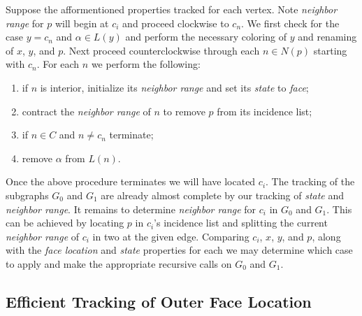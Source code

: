 \documentclass[11pt,letter]{article}
\begin{document}
\noindent Suppose the afformentioned properties tracked for each vertex. Note \emph{neighbor range}
for $p$ will begin at $c_i$ and proceed clockwise to $c_n$. We first check for the case $y=c_n$ and
$\alpha\in L(y)$ and perform the necessary coloring of $y$ and renaming of $x$, $y$, and $p$. Next proceed
counterclockwise through each $n\in N(p)$ starting with $c_n$. For each $n$ we perform the following:

\begin{enumerate}
\item if $n$ is interior, initialize its \emph{neighbor range} and set its \emph{state} to \emph{face};
\item contract the \emph{neighbor range} of $n$ to remove $p$ from its incidence list;
\item if $n\in C$ and $n\ne c_n$ terminate;
\item remove $\alpha$ from $L(n)$.
\end{enumerate}

\noindent Once the above procedure terminates we will have located $c_i$. The tracking of the subgraphs $G_0$ and $G_1$
are already almost complete by our tracking of \emph{state} and \emph{neighbor range}. It remains to determine
\emph{neighbor range} for $c_i$ in $G_0$ and $G_1$. This can be achieved by locating $p$ in $c_i$'s incidence list
and splitting the current \emph{neighbor range} of $c_i$ in two at the given edge. Comparing $c_i$, $x$, $y$, and
$p$, along with the \emph{face location} and \emph{state} properties for each we may determine which case to
apply and make the appropriate recursive calls on $G_0$ and $G_1$.

\subsection*{Efficient Tracking of Outer Face Location}


\begin{comment}
\begin{algorithm}
\LinesNumbered
\DontPrintSemicolon
\KwIn{Plane graph $G$ and paths $P=p_0\ldots p_n$ and $Q=q_0\ldots q_m$}
\Begin{
	\Repeat{$t_0\not\in P\cup Q$} {
		$t_0\longleftarrow$ vertex forming face with $p_0$ and $q_0$\;
		\If{$t_0 = p_1$} {
			$P\longleftarrow P - p_0$\;
		}
		\ElseIf{$t_0 = q_1$} {
			$Q\longleftarrow Q - q_0$\; 
		}
	}
	\Repeat{$t_1\not\in P\cup Q$} {
		$t_1\longleftarrow$ vertex forming face with $p_n$ and $q_m$\;
		\If{$t_1 = p_{n-1}$} {
			$P\longleftarrow P - p_n$\;
		}
		\ElseIf{$t_1 = q_{m-1}$} {
			$Q\longleftarrow Q - q_m$\; 
		}
	}
	perform BFS starting at $t_1$\;
	\If{BFS finds $t_0$} {
		$T\longleftarrow$ BFS path $t_0$ to $t_1$\;
	}
	\Else {
		we hit an vertex $u$ with neighbors $p_i\in P$ and $q_j\in Q$\;
		$T\longleftarrow$ BFS path $u$ to $t_1$\;
		recurse on subgraph bounded by $p_0\ldots p_i$ and $q_0\ldots q_j$\;
		$P\longleftarrow p_i\ldots p_n$\;
		$Q\longleftarrow q_j\ldots q_m$\;
	}
	recurse on subgraph bounded by $P$ and $T$\;
	recurse on subgraph bounded by $T$ and $Q$\;
}
\caption{Path 3-Color}
\end{algorithm}
\end{comment}
\end{document}
